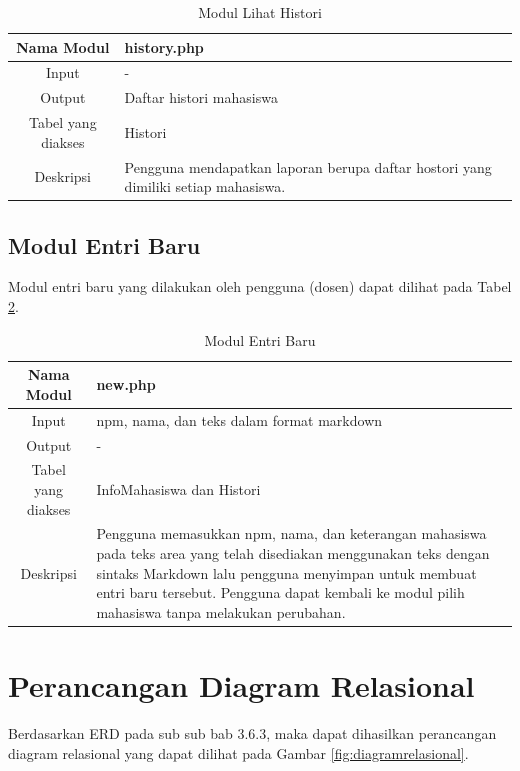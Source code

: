 \begin{table}[ht]
\centering
\caption[Tabel Modul Lihat Histori]{Modul Lihat Histori}
\label{tab:modullihathistori}
\begin{tabular}{|c|p{7cm}|}
\hline
Nama Modul & history.php\\
\hline
Input & -\\
\hline
Output & Daftar histori mahasiswa\\
\hline
Tabel yang diakses & Histori\\
\hline
Deskripsi & Pengguna mendapatkan laporan berupa daftar hostori yang dimiliki
setiap mahasiswa.\\
\hline
\end{tabular}
\end{table}

\subsection{Modul Entri Baru}
Modul entri baru yang dilakukan oleh pengguna (dosen) dapat dilihat pada Tabel
\ref{tab:modulentribaru}.

\begin{table}[ht]
\centering
\caption[Tabel Modul Entri Baru]{Modul Entri Baru} 
\label{tab:modulentribaru}
\begin{tabular}{|c|p{7cm}|}
\hline
Nama Modul & new.php\\
\hline
Input & npm, nama, dan teks dalam format markdown\\
\hline
Output & -\\
\hline
Tabel yang diakses & InfoMahasiswa dan Histori\\
\hline
Deskripsi & Pengguna memasukkan npm, nama, dan keterangan mahasiswa pada teks
area yang telah disediakan menggunakan teks dengan sintaks Markdown lalu
pengguna menyimpan untuk membuat entri baru tersebut. Pengguna dapat kembali ke
modul pilih mahasiswa tanpa melakukan perubahan.\\
\hline
\end{tabular}
\end{table}

\section{Perancangan Diagram Relasional}
\label{sec:perancangandiagramrelasional}

Berdasarkan ERD pada sub sub bab 3.6.3, maka dapat dihasilkan perancangan diagram relasional yang dapat dilihat pada Gambar \ref{fig:diagramrelasional}.

